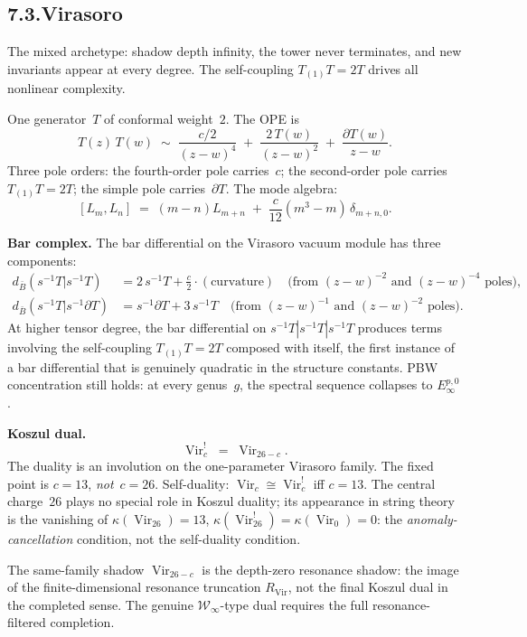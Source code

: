 \documentclass[11pt]{report}
\theoremstyle{definition}
\theoremstyle{remark}
\providecommand{\barB}{\bar{B}}
\numberwithin{equation}{section}
\begin{document}
\subsection*{7.3.\quad Virasoro}

The mixed archetype: shadow depth infinity,
the tower never terminates, and new invariants appear at every degree.
The self-coupling $T_{(1)}T = 2T$ drives all nonlinear
complexity.

One generator~$T$ of conformal weight~$2$. The OPE is
\[
T(z)\,T(w)
\;\sim\;
\frac{c/2}{(z-w)^4}
\;+\;
\frac{2\,T(w)}{(z-w)^2}
\;+\;
\frac{\partial T(w)}{z-w}.
\]
Three pole orders: the fourth-order pole carries~$c$;
the second-order pole carries $T_{(1)}T=2T$; the simple pole
carries~$\partial T$. The mode algebra:
\[
[L_m,L_n]
\;=\;
(m-n)L_{m+n}
\;+\;
\frac{c}{12}(m^3-m)\,\delta_{m+n,0}.
\]

\medskip
\noindent\textbf{Bar complex.}
The bar differential on the Virasoro vacuum module has three components:
\begin{align*}
d_{\barB}(s^{-1}T|s^{-1}T)
&=
2\,s^{-1}T + \frac{c}{2}\cdot(\text{curvature})
\quad\text{(from $(z-w)^{-2}$ and $(z-w)^{-4}$ poles)},\\
d_{\barB}(s^{-1}T|s^{-1}\partial T)
&=
s^{-1}\partial T + 3\,s^{-1}T
\quad\text{(from $(z-w)^{-1}$ and $(z-w)^{-2}$ poles)}.
\end{align*}
At higher tensor degree, the bar differential on
$s^{-1}T|s^{-1}T|s^{-1}T$ produces terms involving the
self-coupling $T_{(1)}T=2T$ composed with itself, the first
instance of a bar differential that is genuinely quadratic in the
structure constants. PBW concentration still holds: at every
genus~$g$, the spectral sequence collapses to $E_\infty^{p,0}$.

\medskip
\noindent\textbf{Koszul dual.}
\[
\operatorname{Vir}_c^!
\;=\;
\operatorname{Vir}_{26-c}.
\]
The duality is an involution on the one-parameter Virasoro family.
The fixed point is $c=13$, \emph{not}~$c=26$. Self-duality:
$\operatorname{Vir}_c \cong \operatorname{Vir}_c^!$ iff $c=13$.
The central charge~$26$ plays no special role in Koszul duality; its
appearance in string theory is the vanishing of
$\kappa(\operatorname{Vir}_{26})=13$,
$\kappa(\operatorname{Vir}_{26}^!)=\kappa(\operatorname{Vir}_0)=0$: the
\emph{anomaly-cancellation} condition, not the self-duality condition.

The same-family shadow $\operatorname{Vir}_{26-c}$ is the
depth-zero resonance shadow: the image of the finite-dimensional
resonance truncation $R_{\mathrm{Vir}}$, not the final Koszul dual in
the completed sense. The genuine $\mathcal W_\infty$-type dual
requires the full resonance-filtered completion.
\end{document}

